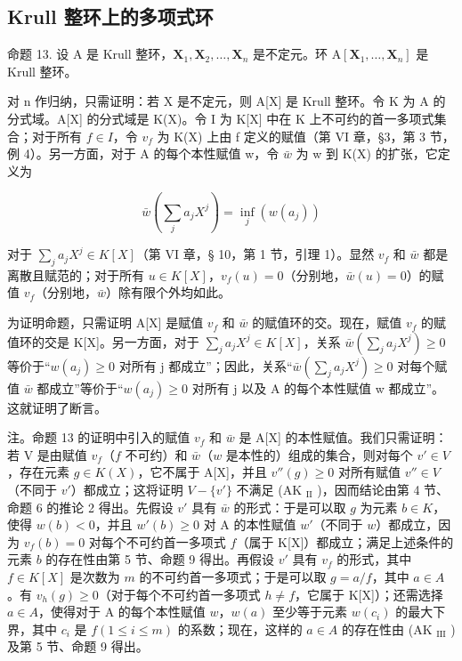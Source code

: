 \subsection{Krull 整环上的多项式环}

命题 13. 设 A 是 Krull 整环，\(\mathbf{X}_1, \mathbf{X}_2, \ldots, \mathbf{X}_n\) 是不定元。环 \(\mathrm{A}[\mathbf{X}_1, \ldots, \mathbf{X}_n]\) 是 Krull 整环。

对 n 作归纳，只需证明：若 X 是不定元，则 A{[}X{]} 是 Krull 整环。令 K 为 A 的分式域。A{[}X{]} 的分式域是 K(X)。令 I 为 K{[}X{]} 中在 K 上不可约的首一多项式集合；对于所有 \(f \in I\)，令 \(v_{f}\) 为 K(X) 上由 f 定义的赋值（第 VI 章，§3，第 3 节，例 4）。另一方面，对于 A 的每个本性赋值 w，令 \(\bar{w}\) 为 w 到 K(X) 的扩张，它定义为

\[
\bar {w} \left(\sum_ {j} a _ {j} X ^ {j}\right) = \inf _ {j} (w (a _ {j}))
\]

对于 \(\sum_{j} a_j X^j \in K[X]\)（第 VI 章，§ 10，第 1 节，引理 1）。显然 \(v_f\) 和 \(\bar{w}\) 都是离散且赋范的；对于所有 \(u \in K[X]\)，\(v_f(u) = 0\)（分别地，\(\bar{w}(u) = 0\)）的赋值 \(v_f\)（分别地，\(\bar{w}\)）除有限个外均如此。

为证明命题，只需证明 A{[}X{]} 是赋值 \(v_{f}\) 和 \(\bar{w}\) 的赋值环的交。现在，赋值 \(v_{f}\) 的赋值环的交是 K{[}X{]}。另一方面，对于 \(\sum_{j} a_{j} X^{j} \in K[X]\)，关系 \(\bar{w}\left(\sum_{j} a_{j} X^{j}\right) \geqslant 0\) 等价于“\(w(a_{j}) \geqslant 0\) 对所有 j 都成立”；因此，关系“\(\bar{w}\left(\sum_{j} a_{j} X^{j}\right) \geqslant 0\) 对每个赋值 \(\bar{w}\) 都成立”等价于“\(w(a_{j}) \geqslant 0\) 对所有 j 以及 A 的每个本性赋值 w 都成立”。这就证明了断言。

注。命题 13 的证明中引入的赋值 \(v_f\) 和 \(\bar{w}\) 是 A{[}X{]} 的本性赋值。我们只需证明：若 V 是由赋值 \(v_f\)（\(f\) 不可约）和 \(\bar{w}\)（\(w\) 是本性的）组成的集合，则对每个 \(v' \in V\)，存在元素 \(g \in K(X)\)，它不属于 A{[}X{]}，并且 \(v''(g) \geqslant 0\) 对所有赋值 \(v'' \in V\)（不同于 \(v'\)）都成立；这将证明 \(V - \{v'\}\) 不满足 (AK \(_{\text{II}}\) )，因而结论由第 4 节、命题 6 的推论 2 得出。先假设 \(v'\) 具有 \(\bar{w}\) 的形式：于是可以取 \(g\) 为元素 \(b \in K\)，使得 \(w(b) < 0\)，并且 \(w'(b) \geqslant 0\) 对 A 的本性赋值 \(w'\)（不同于 \(w\)）都成立，因为 \(v_f(b) = 0\) 对每个不可约首一多项式 \(f\)（属于 K{[}X{]}）都成立；满足上述条件的元素 \(b\) 的存在性由第 5 节、命题 9 得出。再假设 \(v'\) 具有 \(v_f\) 的形式，其中 \(f \in K[X]\) 是次数为 \(m\) 的不可约首一多项式；于是可以取 \(g = a/f\)，其中 \(a \in A\)。有 \(v_h(g) \geqslant 0\)（对于每个不可约首一多项式 \(h \neq f\)，它属于 K{[}X{]}）；还需选择 \(a \in A\)，使得对于 A 的每个本性赋值 \(w\)，\(w(a)\) 至少等于元素 \(w(c_i)\) 的最大下界，其中 \(c_i\) 是 \(f (1 \leqslant i \leqslant m)\) 的系数；现在，这样的 \(a \in A\) 的存在性由 (AK \(_{\text{III}}\) ) 及第 5 节、命题 9 得出。

